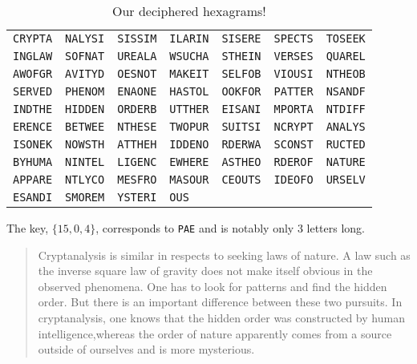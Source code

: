 \documentclass[12pt]{article}
\theoremstyle{remark}  %
\begin{document}
    \begin{table}[h]
        \begin{center}
            \begin{tabular}{lllllll}
                \texttt{CRYPTA} & \texttt{NALYSI} & \texttt{SISSIM} & \texttt{ILARIN} & \texttt{SISERE} & \texttt{SPECTS} & \texttt{TOSEEK} \\
                \texttt{INGLAW} & \texttt{SOFNAT} & \texttt{UREALA} & \texttt{WSUCHA} & \texttt{STHEIN} & \texttt{VERSES} & \texttt{QUAREL} \\
                \texttt{AWOFGR} & \texttt{AVITYD} & \texttt{OESNOT} & \texttt{MAKEIT} & \texttt{SELFOB} & \texttt{VIOUSI} & \texttt{NTHEOB} \\
                \texttt{SERVED} & \texttt{PHENOM} & \texttt{ENAONE} & \texttt{HASTOL} & \texttt{OOKFOR} & \texttt{PATTER} & \texttt{NSANDF} \\
                \texttt{INDTHE} & \texttt{HIDDEN} & \texttt{ORDERB} & \texttt{UTTHER} & \texttt{EISANI} & \texttt{MPORTA} & \texttt{NTDIFF} \\
                \texttt{ERENCE} & \texttt{BETWEE} & \texttt{NTHESE} & \texttt{TWOPUR} & \texttt{SUITSI} & \texttt{NCRYPT} & \texttt{ANALYS} \\
                \texttt{ISONEK} & \texttt{NOWSTH} & \texttt{ATTHEH} & \texttt{IDDENO} & \texttt{RDERWA} & \texttt{SCONST} & \texttt{RUCTED} \\
                \texttt{BYHUMA} & \texttt{NINTEL} & \texttt{LIGENC} & \texttt{EWHERE} & \texttt{ASTHEO} & \texttt{RDEROF} & \texttt{NATURE} \\
                \texttt{APPARE} & \texttt{NTLYCO} & \texttt{MESFRO} & \texttt{MASOUR} & \texttt{CEOUTS} & \texttt{IDEOFO} & \texttt{URSELV} \\
                \texttt{ESANDI} & \texttt{SMOREM} & \texttt{YSTERI} & \texttt{OUS} & & & \\
            \end{tabular}
        \end{center}
        \captionsetup{labelformat=empty}
        \caption*{Our deciphered hexagrams!}
    \end{table}

    The key, $\{15, 0, 4\}$, corresponds to \texttt{PAE} and is notably only 3 letters long.
    \begin{quote}
        Cryptanalysis is similar in respects to seeking laws of nature. A law such as the inverse square law of gravity does not make itself obvious in the observed phenomena. One has to look for patterns and find the hidden order. But there is an important difference between these two pursuits. In cryptanalysis, one knows that the hidden order was constructed by human intelligence,whereas the order of nature apparently comes from a source outside of ourselves and is more mysterious.
    \end{quote}
\end{document}
